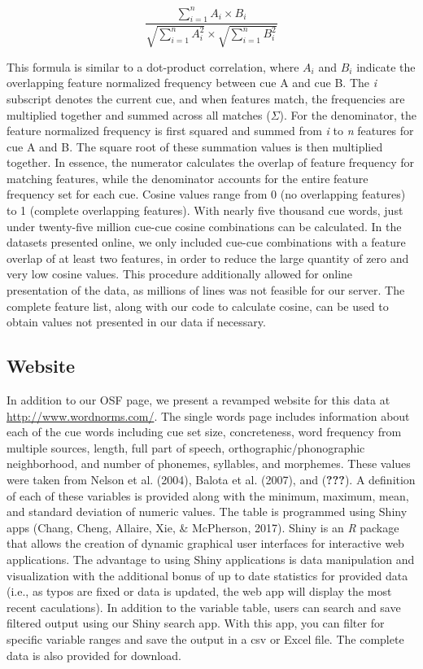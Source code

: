 \documentclass[english,man]{apa6}
\theoremstyle{definition}
\theoremstyle{definition}
\theoremstyle{definition}
\theoremstyle{remark}
\begin{document}
\[
\frac{\sum_{i=1}^{n} A_i \times B_i} {\sqrt{\sum_{i=1}^{n} A_i^2} \times \sqrt{\sum_{i=1}^{n} B_i^2}}
\]

This formula is similar to a dot-product correlation, where \(A_i\) and
\(B_i\) indicate the overlapping feature normalized frequency between
cue A and cue B. The \emph{i} subscript denotes the current cue, and
when features match, the frequencies are multiplied together and summed
across all matches (\(\Sigma\)). For the denominator, the feature
normalized frequency is first squared and summed from \emph{i} to
\emph{n} features for cue A and B. The square root of these summation
values is then multiplied together. In essence, the numerator calculates
the overlap of feature frequency for matching features, while the
denominator accounts for the entire feature frequency set for each cue.
Cosine values range from 0 (no overlapping features) to 1 (complete
overlapping features). With nearly five thousand cue words, just under
twenty-five million cue-cue cosine combinations can be calculated. In
the datasets presented online, we only included cue-cue combinations
with a feature overlap of at least two features, in order to reduce the
large quantity of zero and very low cosine values. This procedure
additionally allowed for online presentation of the data, as millions of
lines was not feasible for our server. The complete feature list, along
with our code to calculate cosine, can be used to obtain values not
presented in our data if necessary.

\subsection{Website}\label{website}

In addition to our OSF page, we present a revamped website for this data
at \url{http://www.wordnorms.com/}. The single words page includes
information about each of the cue words including cue set size,
concreteness, word frequency from multiple sources, length, full part of
speech, orthographic/phonographic neighborhood, and number of phonemes,
syllables, and morphemes. These values were taken from Nelson et al.
(2004), Balota et al. (2007), and ({\textbf{???}}). A definition of each
of these variables is provided along with the minimum, maximum, mean,
and standard deviation of numeric values. The table is programmed using
Shiny apps (Chang, Cheng, Allaire, Xie, \& McPherson, 2017). Shiny is an
\emph{R} package that allows the creation of dynamic graphical user
interfaces for interactive web applications. The advantage to using
Shiny applications is data manipulation and visualization with the
additional bonus of up to date statistics for provided data (i.e., as
typos are fixed or data is updated, the web app will display the most
recent caculations). In addition to the variable table, users can search
and save filtered output using our Shiny search app. With this app, you
can filter for specific variable ranges and save the output in a csv or
Excel file. The complete data is also provided for download.
\end{document}
